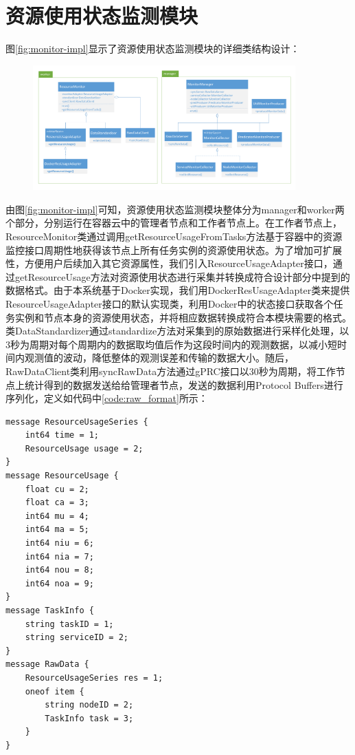 \section{资源使用状态监测模块}
图\ref{fig:monitor-impl}显示了资源使用状态监测模块的详细类结构设计：
\begin{figure}[htbp]
\centering
\includegraphics[width=0.9\textwidth]{./figure/monitor_impl}
\end{figure}

由图\ref{fig:monitor-impl}可知，资源使用状态监测模块整体分为manager和worker两个部分，分别运行在容器云中的管理者节点和工作者节点上。在工作者节点上，ResourceMonitor类通过调用getResourceUsageFromTasks方法基于容器中的资源监控接口周期性地获得该节点上所有任务实例的资源使用状态。为了增加可扩展性，方便用户后续加入其它资源属性，我们引入ResourceUsageAdapter接口，通过getResourceUsage方法对资源使用状态进行采集并转换成符合设计部分中提到的数据格式。由于本系统基于Docker实现，我们用DockerResUsageAdapter类来提供ResourceUsageAdapter接口的默认实现类，利用Docker中的状态接口获取各个任务实例和节点本身的资源使用状态，并将相应数据转换成符合本模块需要的格式。类DataStandardizer通过standardize方法对采集到的原始数据进行采样化处理，以3秒为周期对每个周期内的数据取均值后作为这段时间内的观测数据，以减小短时间内观测值的波动，降低整体的观测误差和传输的数据大小。随后，RawDataClient类利用syncRawData方法通过gPRC接口以30秒为周期，将工作节点上统计得到的数据发送给给管理者节点，发送的数据利用Protocol Buffers进行序列化，定义如代码中\ref{code:raw_format}所示：
\begin{lstlisting}[language=protobuf3,style=protobuf, caption={资源使用状态监测数据},label={code:raw_format}]
message ResourceUsageSeries {
    int64 time = 1;
    ResourceUsage usage = 2;
}
message ResourceUsage {
    float cu = 2;
    float ca = 3;
    int64 mu = 4;
    int64 ma = 5;
    int64 niu = 6;
    int64 nia = 7;
    int64 nou = 8;
    int64 noa = 9;
}
message TaskInfo {
    string taskID = 1;
    string serviceID = 2;
}
message RawData {
    ResourceUsageSeries res = 1;
    oneof item {
        string nodeID = 2;
        TaskInfo task = 3;
    }
}
\end{lstlisting}

